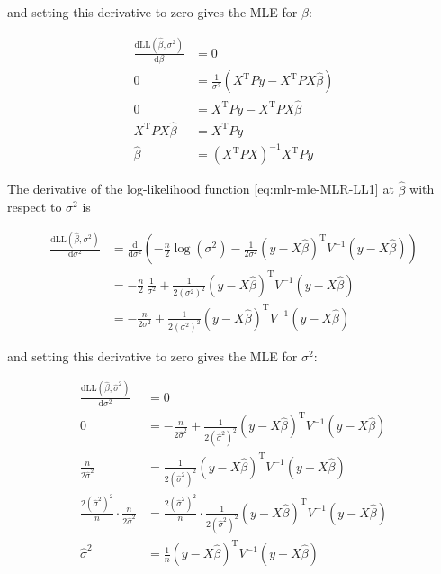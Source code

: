 \documentclass[a4paper,12pt,twoside]{book}
\begin{document}
and setting this derivative to zero gives the MLE for $\beta$:

\begin{equation} \label{eq:mlr-mle-beta-MLE}
\begin{split}
\frac{\mathrm{d}\mathrm{LL}(\hat{\beta},\sigma^2)}{\mathrm{d}\beta} &= 0 \\
0 &= \frac{1}{\sigma^2} \left( X^\mathrm{T} P y - X^\mathrm{T} P X \hat{\beta} \right) \\
0 &= X^\mathrm{T} P y - X^\mathrm{T} P X \hat{\beta} \\
X^\mathrm{T} P X \hat{\beta} &= X^\mathrm{T} P y \\
\hat{\beta} &= \left( X^\mathrm{T} P X \right)^{-1} X^\mathrm{T} P y
\end{split}
\end{equation}

\vspace{1em}
The derivative of the log-likelihood function \eqref{eq:mlr-mle-MLR-LL1} at $\hat{\beta}$ with respect to $\sigma^2$ is

\begin{equation} \label{eq:mlr-mle-dLL-ds2}
\begin{split}
\frac{\mathrm{d}\mathrm{LL}(\hat{\beta},\sigma^2)}{\mathrm{d}\sigma^2} &= \frac{\mathrm{d}}{\mathrm{d}\sigma^2} \left( - \frac{n}{2} \log (\sigma^2) - \frac{1}{2 \sigma^2} (y - X\hat{\beta})^\mathrm{T} V^{-1} (y - X\hat{\beta}) \right) \\
&= - \frac{n}{2} \, \frac{1}{\sigma^2} + \frac{1}{2 (\sigma^2)^2} (y - X\hat{\beta})^\mathrm{T} V^{-1} (y - X\hat{\beta}) \\
&= - \frac{n}{2 \sigma^2} + \frac{1}{2 (\sigma^2)^2} (y - X\hat{\beta})^\mathrm{T} V^{-1} (y - X\hat{\beta})
\end{split}
\end{equation}

and setting this derivative to zero gives the MLE for $\sigma^2$:

\begin{equation} \label{eq:mlr-mle-s2-MLE}
\begin{split}
\frac{\mathrm{d}\mathrm{LL}(\hat{\beta},\hat{\sigma}^2)}{\mathrm{d}\sigma^2} &= 0 \\
0 &= - \frac{n}{2 \hat{\sigma}^2} + \frac{1}{2 (\hat{\sigma}^2)^2} (y - X\hat{\beta})^\mathrm{T} V^{-1} (y - X\hat{\beta}) \\
\frac{n}{2 \hat{\sigma}^2} &= \frac{1}{2 (\hat{\sigma}^2)^2} (y - X\hat{\beta})^\mathrm{T} V^{-1} (y - X\hat{\beta}) \\
\frac{2 (\hat{\sigma}^2)^2}{n} \cdot \frac{n}{2 \hat{\sigma}^2} &= \frac{2 (\hat{\sigma}^2)^2}{n} \cdot \frac{1}{2 (\hat{\sigma}^2)^2} (y - X\hat{\beta})^\mathrm{T} V^{-1} (y - X\hat{\beta}) \\
\hat{\sigma}^2 &= \frac{1}{n} (y - X\hat{\beta})^\mathrm{T} V^{-1} (y - X\hat{\beta})
\end{split}
\end{equation}
\end{document}
